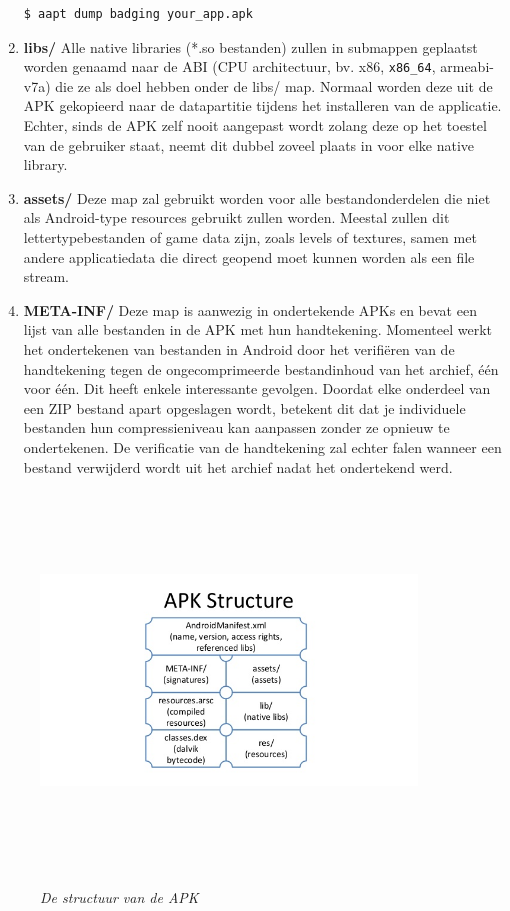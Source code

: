 \begin{enumerate}
\begin{lstlisting}[backgroundcolor = \color{lightgray}, xleftmargin = 2cm,
framexleftmargin = 1em]
$ aapt dump badging your_app.apk
\end{lstlisting}
\item \textbf{libs/}\newline
Alle native libraries (*.so bestanden) zullen in submappen geplaatst worden genaamd naar de ABI (CPU architectuur, bv. x86, \texttt{x86\_64}, armeabi-v7a) die ze als doel hebben onder de libs/ map. Normaal worden deze uit de APK gekopieerd naar de datapartitie tijdens het installeren van de applicatie. Echter, sinds de APK zelf nooit aangepast wordt zolang deze op het toestel van de gebruiker staat, neemt dit dubbel zoveel plaats in voor elke native library. 
\item \textbf{assets/}\newline
Deze map zal gebruikt worden voor alle bestandonderdelen die niet als Android-type resources gebruikt zullen worden. Meestal zullen dit lettertypebestanden of game data zijn, zoals levels of textures, samen met andere applicatiedata die direct geopend moet kunnen worden als een file stream.
\item \textbf{META-INF/}\newline
Deze map is aanwezig in ondertekende APKs en bevat een lijst van alle bestanden in de APK met hun handtekening. Momenteel werkt het ondertekenen van bestanden in Android door het verifiëren van de handtekening tegen de ongecomprimeerde bestandinhoud van het archief, één voor één. Dit heeft enkele interessante gevolgen. Doordat elke onderdeel van een ZIP bestand apart opgeslagen wordt, betekent dit dat je individuele bestanden hun compressieniveau kan aanpassen zonder ze opnieuw te ondertekenen. De verificatie van de handtekening zal echter falen wanneer een bestand verwijderd wordt uit het archief nadat het ondertekend werd. 
\end{enumerate}

\begin{figure}[H]
	\centering
	\caption{\textit{De structuur van de APK}}
	\includegraphics[width=10cm, height=10cm, keepaspectratio]{img/ApkStructure}\\[.5cm]
	
\end{figure}

